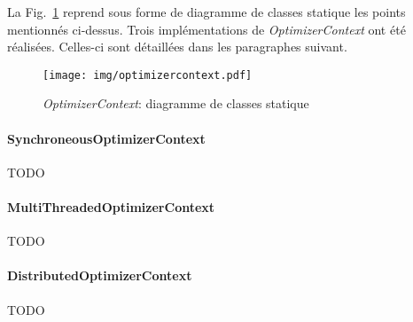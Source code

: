 \documentclass[a4paper, 11pt]{report}
\begin{document}
La Fig.~\ref{optimizercontext} reprend sous forme de diagramme de classes statique les points mentionnés ci-dessus. Trois implémentations de \textit{OptimizerContext} ont été réalisées. Celles-ci sont détaillées dans les paragraphes suivant.

\begin{figure}[!h]
\centering
\texttt{[image: img/optimizercontext.pdf]}
\caption{\textit{OptimizerContext}: diagramme de classes statique}
\label{optimizercontext}
\end{figure}

\paragraph{SynchroneousOptimizerContext} TODO

\paragraph{MultiThreadedOptimizerContext} TODO

\paragraph{DistributedOptimizerContext} TODO

\end{document}
